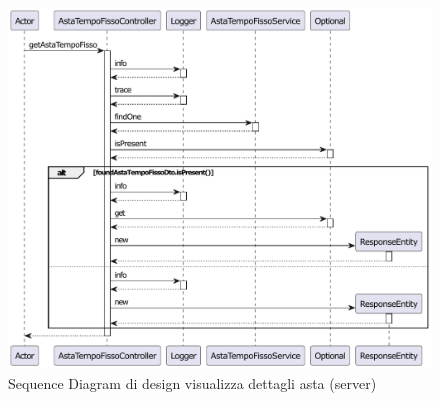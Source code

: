             \begin{figure}[htbp!]
                \centering
                    \includegraphics[width=1\linewidth]{Immagini/Diagrammi/Sequence Diagram/Design/Server Sequence Design/ServerSequenceDettagliAstaDesign.pdf}
                \caption{Sequence Diagram di design visualizza dettagli asta (server)}
                \label{fig:Sequence Diagram di design visualizza dettagli asta (server)}
            \end{figure}

        \clearpage

